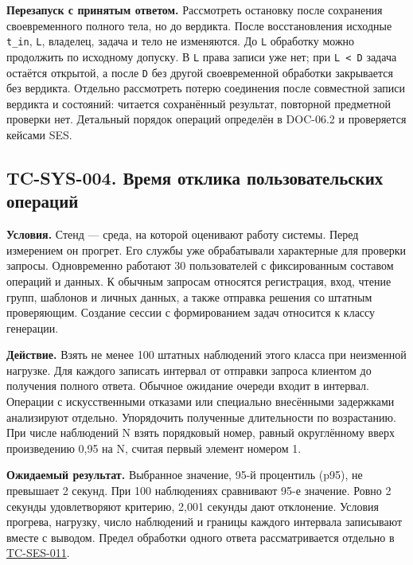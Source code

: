 \documentclass[12pt,a4paper]{article}
\begin{document}
\textbf{Перезапуск с принятым ответом.} Рассмотреть остановку после сохранения своевременного полного тела, но до вердикта. После восстановления исходные \texttt{t\_in}, \texttt{L}, владелец, задача и тело не изменяются. До \texttt{L} обработку можно продолжить по исходному допуску. В \texttt{L} права записи уже нет; при \texttt{L\ \textless{}\ D} задача остаётся открытой, а после \texttt{D} без другой своевременной обработки закрывается без вердикта. Отдельно рассмотреть потерю соединения после совместной записи вердикта и состояний: читается сохранённый результат, повторной предметной проверки нет. Детальный порядок операций определён в DOC-06.2 и проверяется кейсами SES.

\subsection{TC-SYS-004. Время отклика пользовательских операций}\label{tc-sys-004-ux432ux440ux435ux43cux44f-ux43eux442ux43aux43bux438ux43aux430-ux43fux43eux43bux44cux437ux43eux432ux430ux442ux435ux43bux44cux441ux43aux438ux445-ux43eux43fux435ux440ux430ux446ux438ux439}

\hypertarget{tc-sys-004-время-отклика-пользовательских-операций}{}

\hypertarget{tc-sys-004}{}

\textbf{Условия.} Стенд --- среда, на которой оценивают работу системы. Перед измерением он прогрет. Его службы уже обрабатывали характерные для проверки запросы. Одновременно работают 30 пользователей с фиксированным составом операций и данных. К обычным запросам относятся регистрация, вход, чтение групп, шаблонов и личных данных, а также отправка решения со штатным проверяющим. Создание сессии с формированием задач относится к классу генерации.

\textbf{Действие.} Взять не менее 100 штатных наблюдений этого класса при неизменной нагрузке. Для каждого записать интервал от отправки запроса клиентом до получения полного ответа. Обычное ожидание очереди входит в интервал. Операции с искусственными отказами или специально внесёнными задержками анализируют отдельно. Упорядочить полученные длительности по возрастанию. При числе наблюдений N взять порядковый номер, равный округлённому вверх произведению 0,95 на N, считая первый элемент номером 1.

\textbf{Ожидаемый результат.} Выбранное значение, 95-й процентиль (p95), не превышает 2 секунд. При 100 наблюдениях сравнивают 95-е значение. Ровно 2 секунды удовлетворяют критерию, 2,001 секунды дают отклонение. Условия прогрева, нагрузку, число наблюдений и границы каждого интервала записывают вместе с выводом. Предел обработки одного ответа рассматривается отдельно в {\hyperlink{tc-ses-011}{TC-SES-011}}.
\end{document}
